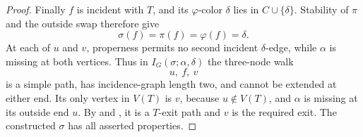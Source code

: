 \begin{proof}
Finally $f$ is incident with $T$, and its $\varphi$-color $\delta$ lies in
$C\cup\{\delta\}$.  Stability of $\pi$ and the outside swap therefore give
\[
                    \sigma(f)=\pi(f)=\varphi(f)=\delta.
\]
At each of $u$ and $v$, properness permits no second incident
$\delta$-edge, while $\alpha$ is missing at both vertices.  Thus in
$I_G(\sigma;\alpha,\delta)$ the three-node walk
\[
             u,\ f,\ v
\]
is a simple path, has incidence-graph length two, and cannot be extended at
either end.  Its only vertex in $V(T)$ is $v$, because $u\notin V(T)$, and
$\alpha$ is missing at its outside end $u$.  By
 and , it is a $T$-exit path and
$v$ is the required exit.  The constructed $\sigma$ has all asserted
properties.
\end{proof}
